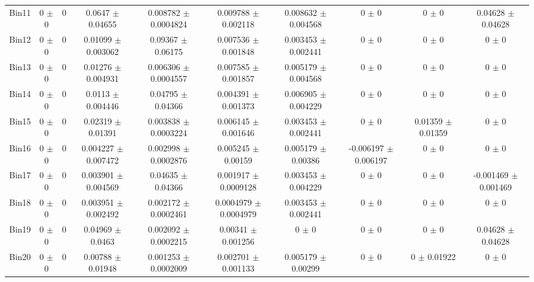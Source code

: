 \begin{tabular}{@{\extracolsep{4pt}}lccccccccc@{}}
     Bin11 & 0 $\pm$ 0 & 0 & 0.0647 $\pm$ 0.04655 & 0.008782 $\pm$ 0.0004824 & 0.009788 $\pm$ 0.002118 & 0.008632 $\pm$ 0.004568 & 0 $\pm$ 0 & 0 $\pm$ 0 & 0.04628 $\pm$ 0.04628 \\ 
     Bin12 & 0 $\pm$ 0 & 0 & 0.01099 $\pm$ 0.003062 & 0.09367 $\pm$ 0.06175 & 0.007536 $\pm$ 0.001848 & 0.003453 $\pm$ 0.002441 & 0 $\pm$ 0 & 0 $\pm$ 0 & 0 $\pm$ 0 \\ 
     Bin13 & 0 $\pm$ 0 & 0 & 0.01276 $\pm$ 0.004931 & 0.006306 $\pm$ 0.0004557 & 0.007585 $\pm$ 0.001857 & 0.005179 $\pm$ 0.004568 & 0 $\pm$ 0 & 0 $\pm$ 0 & 0 $\pm$ 0 \\ 
     Bin14 & 0 $\pm$ 0 & 0 & 0.0113 $\pm$ 0.004446 & 0.04795 $\pm$ 0.04366 & 0.004391 $\pm$ 0.001373 & 0.006905 $\pm$ 0.004229 & 0 $\pm$ 0 & 0 $\pm$ 0 & 0 $\pm$ 0 \\ 
     Bin15 & 0 $\pm$ 0 & 0 & 0.02319 $\pm$ 0.01391 & 0.003838 $\pm$ 0.0003224 & 0.006145 $\pm$ 0.001646 & 0.003453 $\pm$ 0.002441 & 0 $\pm$ 0 & 0.01359 $\pm$ 0.01359 & 0 $\pm$ 0 \\ 
     Bin16 & 0 $\pm$ 0 & 0 & 0.004227 $\pm$ 0.007472 & 0.002998 $\pm$ 0.0002876 & 0.005245 $\pm$ 0.00159 & 0.005179 $\pm$ 0.00386 & -0.006197 $\pm$ 0.006197 & 0 $\pm$ 0 & 0 $\pm$ 0 \\ 
     Bin17 & 0 $\pm$ 0 & 0 & 0.003901 $\pm$ 0.004569 & 0.04635 $\pm$ 0.04366 & 0.001917 $\pm$ 0.0009128 & 0.003453 $\pm$ 0.004229 & 0 $\pm$ 0 & 0 $\pm$ 0 & -0.001469 $\pm$ 0.001469 \\ 
     Bin18 & 0 $\pm$ 0 & 0 & 0.003951 $\pm$ 0.002492 & 0.002172 $\pm$ 0.0002461 & 0.0004979 $\pm$ 0.0004979 & 0.003453 $\pm$ 0.002441 & 0 $\pm$ 0 & 0 $\pm$ 0 & 0 $\pm$ 0 \\ 
     Bin19 & 0 $\pm$ 0 & 0 & 0.04969 $\pm$ 0.0463 & 0.002092 $\pm$ 0.0002215 & 0.00341 $\pm$ 0.001256 & 0 $\pm$ 0 & 0 $\pm$ 0 & 0 $\pm$ 0 & 0.04628 $\pm$ 0.04628 \\ 
     Bin20 & 0 $\pm$ 0 & 0 & 0.00788 $\pm$ 0.01948 & 0.001253 $\pm$ 0.0002009 & 0.002701 $\pm$ 0.001133 & 0.005179 $\pm$ 0.00299 & 0 $\pm$ 0 & 0 $\pm$ 0.01922 & 0 $\pm$ 0 \\ 
\hline\hline
  \end{tabular}
